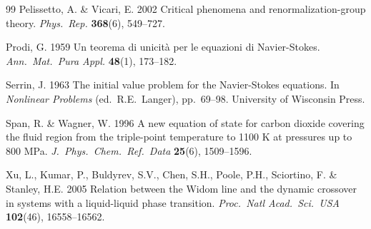 \documentclass[12pt,a4paper]{article}
\begin{document}
\begin{thebibliography}{99}
Pelissetto, A. \& Vicari, E. 2002
Critical phenomena and renormalization-group theory.
\textit{Phys.\ Rep.} \textbf{368}(6), 549--727.

Prodi, G. 1959
Un teorema di unicit\`a per le equazioni di Navier-Stokes.
\textit{Ann.\ Mat.\ Pura Appl.} \textbf{48}(1), 173--182.

Serrin, J. 1963
The initial value problem for the Navier-Stokes equations.
In \textit{Nonlinear Problems} (ed.\ R.E.\ Langer), pp.\ 69--98.
University of Wisconsin Press.

Span, R. \& Wagner, W. 1996
A new equation of state for carbon dioxide covering the fluid region
from the triple-point temperature to 1100 K at pressures up to 800 MPa.
\textit{J.\ Phys.\ Chem.\ Ref.\ Data} \textbf{25}(6), 1509--1596.

Xu, L., Kumar, P., Buldyrev, S.V., Chen, S.H., Poole, P.H., Sciortino, F.
\& Stanley, H.E. 2005
Relation between the Widom line and the dynamic crossover in systems with
a liquid-liquid phase transition.
\textit{Proc.\ Natl Acad.\ Sci.\ USA} \textbf{102}(46), 16558--16562.

\end{thebibliography}
\end{document}
